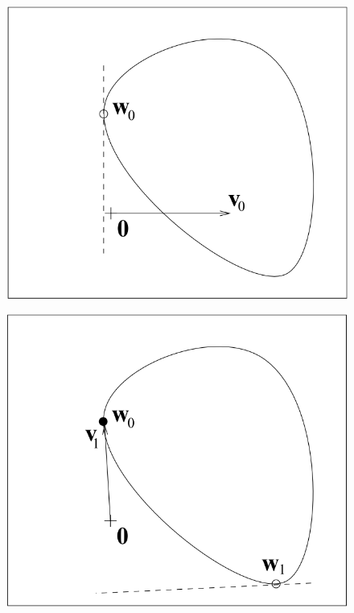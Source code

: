 \begin{figure}[h]
	\centering
	\begin{minipage}[h]{0.3\textwidth}
		\includegraphics[width=1\textwidth]{import/GJK_1.png}
		\label{fig:GJK1}
	\end{minipage}
	\hspace{1cm}
	\begin{minipage}[h]{0.3\textwidth}
		\includegraphics[width=1\textwidth]{import/GJK_2.png}

\end{minipage}
\end{figure}

